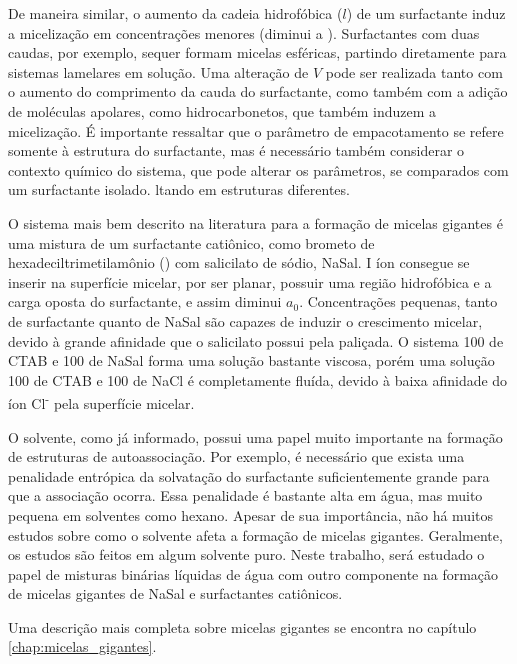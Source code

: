 	De maneira similar, o aumento da cadeia hidrofóbica (\(l\)) de um surfactante induz a micelização em concentrações menores (diminui a \cmc). Surfactantes com duas caudas, por exemplo, sequer formam micelas esféricas, partindo diretamente para sistemas lamelares em solução. Uma alteração de \(V\) pode ser realizada tanto com o aumento do comprimento da cauda do surfactante, como também com a adição de moléculas apolares, como hidrocarbonetos, que também induzem a micelização. É importante ressaltar que o parâmetro de empacotamento se refere somente à estrutura do surfactante, mas é necessário também considerar o contexto químico do sistema, que pode alterar os parâmetros, se comparados com um surfactante isolado.
	ltando em estruturas diferentes. 
	
	O sistema mais bem descrito na literatura para a formação de micelas gigantes é uma mistura de um surfactante catiônico, como brometo de hexadeciltrimetilamônio (\CTAB) com salicilato de sódio, NaSal. I íon \Sal{} consegue se inserir na superfície micelar, por ser planar, possuir uma região hidrofóbica e a carga oposta do surfactante, e assim diminui \(a_0\). Concentrações pequenas, tanto de surfactante quanto de NaSal são capazes de induzir o crescimento micelar, devido à grande afinidade que o salicilato possui pela paliçada. O sistema 100 \mM{} de CTAB e 100 \mM{} de NaSal forma uma solução bastante viscosa, porém uma solução 100 \mM{} de CTAB e 100 \mM{} de NaCl é completamente fluída, devido à baixa afinidade do íon Cl\textsuperscript{-} pela superfície micelar.
	
	
	O solvente, como já informado, possui uma papel muito importante na formação de estruturas de autoassociação. Por exemplo, é necessário que exista uma penalidade entrópica da solvatação do surfactante suficientemente grande para que a associação ocorra. Essa penalidade é bastante alta em água, mas muito pequena em solventes como hexano. Apesar de sua importância, não há muitos estudos sobre como o solvente afeta a formação de micelas gigantes. Geralmente, os estudos são feitos em algum solvente puro. Neste trabalho, será estudado o papel de misturas binárias líquidas de água com outro componente na formação de micelas gigantes de NaSal e surfactantes catiônicos.
	
	
	Uma descrição mais completa sobre micelas gigantes se encontra no capítulo \ref{chap:micelas_gigantes}.
	
